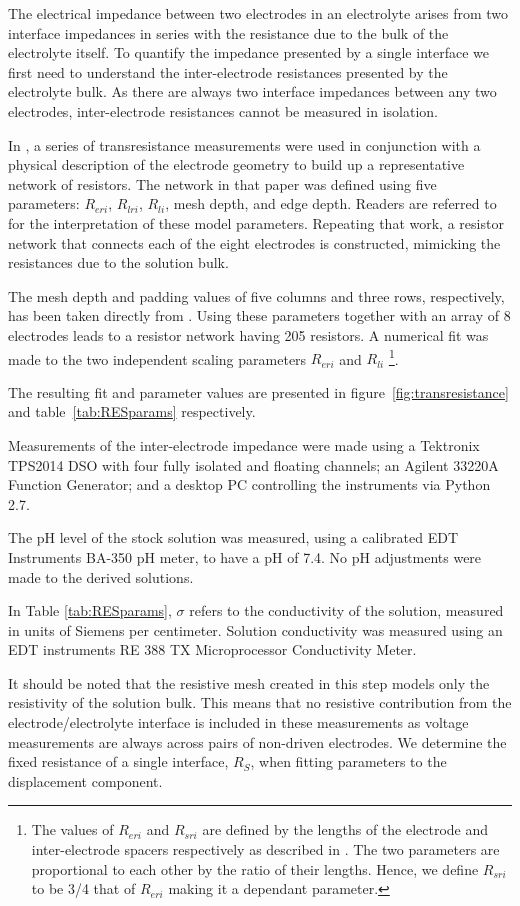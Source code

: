 \documentclass[journal, a4paper]{IEEEtran}
\begin{document}
The electrical impedance between two electrodes in an electrolyte arises from two interface impedances in series with the resistance due to the bulk of the electrolyte itself. To quantify the impedance presented by a single interface we first need to understand the inter-electrode resistances presented by the electrolyte bulk. As there are always two interface impedances between any two electrodes, inter-electrode resistances cannot be measured in isolation.

In \cite{ScottSingle2013}, a series of transresistance measurements were used in conjunction with a physical description of the electrode geometry to build up a representative network of resistors. The network in that paper was defined using five parameters: $R_{eri}$, $R_{lri}$, $R_{li}$, mesh depth, and edge depth. Readers are referred to \cite{ScottSingle2013} for the interpretation of these model parameters. Repeating that work, a resistor network that connects each of the eight electrodes is constructed, mimicking the resistances due to the solution bulk.

The mesh depth and padding values of five columns and three rows, respectively, has been taken directly from \cite{ScottSingle2013}. {\color{blue} Using these parameters together with an array of 8 electrodes leads to a resistor network having 205 resistors.}
A numerical fit was made to the two independent scaling parameters $R_{eri}$ and $R_{li}$
\footnote{The values of $R_{eri}$ and $R_{sri}$ are defined by the lengths of the electrode and inter-electrode spacers respectively as described in \cite{ScottSingle2013}. The two parameters are proportional to each other by the ratio of their lengths. Hence, we define $R_{sri}$ to be 3/4 that of $R_{eri}$ making it a dependant parameter.}.

The resulting fit and parameter values are presented in figure~\ref{fig:transresistance} and table~\ref{tab:RESparams} respectively.

Measurements of the inter-electrode impedance were made using a Tektronix TPS2014 DSO with four fully isolated and floating channels; an Agilent 33220A Function Generator; and a desktop PC controlling the instruments via Python 2.7.

The pH level of the stock solution was measured, using a calibrated EDT Instruments BA-350 pH meter, to have a pH of 7.4. No pH adjustments were made to the derived solutions.


{
    \color{blue}

    In Table \ref{tab:RESparams}, $\sigma$ refers to the conductivity of the solution, measured in units of Siemens per centimeter. Solution conductivity was measured using an EDT instruments RE 388 TX Microprocessor Conductivity Meter.

    It should be noted that the resistive mesh created in this step models only the resistivity of the solution bulk. This means that no resistive contribution from the electrode/electrolyte interface is included in these measurements as voltage measurements are always across pairs of non-driven electrodes. We determine the fixed resistance of a single interface, $R_{S}$, when fitting parameters to the displacement component.
}
\end{document}

